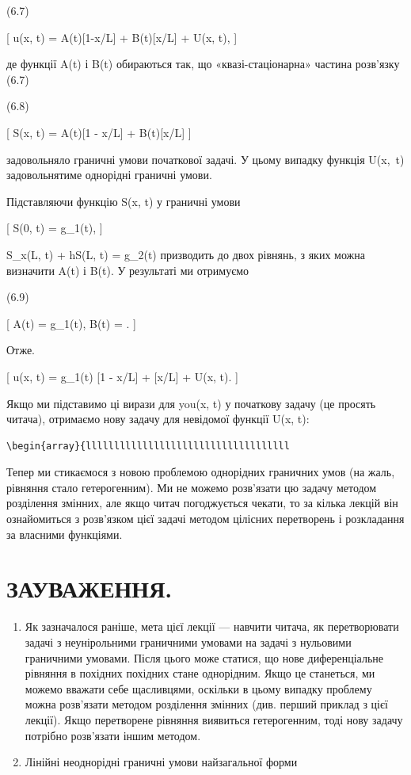 \documentclass[
  ukrainian,
]{article}
\begin{document}
(6.7)

{[} u(x, t) = A(t){[}1-x/L{]} + B(t){[}x/L{]} + U(x, t), {]}

де функції A\left(t\right) і B\left(t\right) обираються так, що
«квазі-стаціонарна» частина розв'язку (6.7)

(6.8)

{[} S(x, t) = A(t){[}1 - x/L{]} + B(t){[}x/L{]} {]}

задовольняло граничні умови початкової задачі. У цьому випадку функція
U\left(x,~t\right) задовольнятиме однорідні граничні умови.

Підставляючи функцію S(x, t) у граничні умови

{[} S(0, t) = g\_1(t), {]}

S\_x(L, t) + hS(L, t) = g\_2(t) призводить до двох рівнянь, з яких можна
визначити A(t) і B(t). У результаті ми отримуємо

(6.9)

{[} A(t) = g\_1(t), B(t) = . {]}

Отже.

{[} u(x, t) = g\_1(t) {[}1 - x/L{]} + 
{[}x/L{]} + U(x, t). {]}

Якщо ми підставимо ці вирази для you(x, t) у початкову задачу (це
просять читача), отримаємо нову задачу для невідомої функції U(x, t):

\begin{verbatim}
\begin{array}{llllllllllllllllllllllllllllllllllll
\end{verbatim}

Тепер ми стикаємося з новою проблемою однорідних граничних умов (на
жаль, рівняння стало гетерогенним). Ми не можемо розв'язати цю задачу
методом розділення змінних, але якщо читач погоджується чекати, то за
кілька лекцій він ознайомиться з розв'язком цієї задачі методом цілісних
перетворень і розкладання за власними функціями.

\section{ЗАУВАЖЕННЯ.}\label{ux437ux430ux443ux432ux430ux436ux435ux43dux43dux44f.}

\begin{enumerate}
\def\labelenumi{\arabic{enumi}.}
\item
  Як зазначалося раніше, мета цієї лекції --- навчити читача, як
  перетворювати задачі з неунірольними граничними умовами на задачі з
  нульовими граничними умовами. Після цього може статися, що нове
  диференціальне рівняння в похідних похідних стане однорідним. Якщо це
  станеться, ми можемо вважати себе щасливцями, оскільки в цьому випадку
  проблему можна розв'язати методом розділення змінних (див. перший
  приклад з цієї лекції). Якщо перетворене рівняння виявиться
  гетерогенним, тоді нову задачу потрібно розв'язати іншим методом.
\item
  Лінійні неоднорідні граничні умови найзагальної форми
\end{enumerate}
\end{document}

